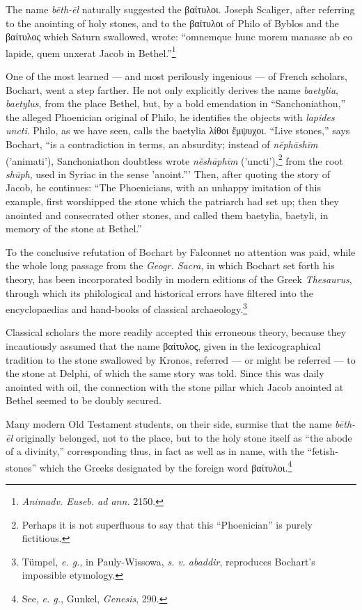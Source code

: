 \documentclass[a4paper, 12pt, oneside, polutonikogreek, english]{article}
\begin{document}
The name \emph{bēth-ēl} naturally suggested the βαίτυλοι. Joseph Scaliger, after referring to the anointing of holy stones, and to the βαίτυλοι of Philo of Byblos and the βαίτυλος which Saturn swallowed, wrote: ``omnemque hunc morem manasse ab eo lapide, quem unxerat Jacob in Bethel.''\footnote{\emph{Animadv. Euseb. ad ann.} 2150.}

One of the most learned --- and most perilously ingenious --- of French scholars, Bochart, went a step farther. He not only explicitly derives the name \emph{baetylia}, \emph{baetylus}, from the place Bethel, but, by a bold emendation in ``Sanchoniathon,'' the alleged Phoenician original of Philo, he identifies the objects with \emph{lapides uncti}. Philo, as we have seen, calls the baetylia λίθοι ἔμψυχοι. ``Live stones,'' says Bochart, ``is a contradiction in terms, an absurdity; instead of \emph{nĕphāshīm} ('animati'), Sanchoniathon doubtless wrote \emph{nĕshāphīm} ('uncti'),\footnote{Perhaps it is not superfluous to say that this ``Phoenician'' is purely fictitious.} from the root \emph{shūph}, used in Syriac in the sense 'anoint.''' Then, after quoting the story of Jacob, he continues: ``The Phoenicians, with an unhappy imitation of this example, first worshipped the stone which the patriarch had set up; then they anointed and consecrated other stones, and called them baetylia, baetyli, in memory of the stone at Bethel.''

To the conclusive refutation of Bochart by Falconnet no attention was paid, while the whole long passage from the \emph{Geogr. Sacra}, in which Bochart set forth his theory, has been incorporated bodily in modern editions of the Greek \emph{Thesaurus}, through which its philological and historical errors have filtered into the encyclopaedias and hand-books of classical archaeology.\footnote{Tümpel, \emph{e. g.}, in Pauly-Wissowa, \emph{s. v.} \emph{abaddir}, reproduces Bochart's impossible etymology.}

Classical scholars the more readily accepted this erroneous theory, because they incautiously assumed that the name βαίτυλος, given in the lexicographical tradition to the stone swallowed by Kronos, referred --- or might be referred --- to the stone at Delphi, of which the same story was told. Since this was daily anointed with oil, the connection with the stone pillar which Jacob anointed at Bethel seemed to be doubly secured.

Many modern Old Testament students, on their side, surmise that the name \emph{bēth-ēl} originally belonged, not to the place, but to the holy stone itself as ``the abode of a divinity,'' corresponding thus, in fact as well as in name, with the ``fetish-stones'' which the Greeks designated by the foreign word βαίτυλοι.\footnote{See, \emph{e. g.}, Gunkel, \emph{Genesis}, 290.}
\end{document}
